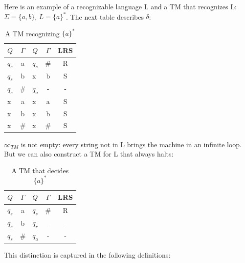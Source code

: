 Here is an example of a recognizable language L and a TM that
recognizes L: $\Sigma = \{a,b\}$, $L = \{a\}^*$. The next table
describes $\delta$:

\begin{table}[ht]
\center
\begin{tabular}{|l|c||l|c|c|}
\hline
$Q$    & $\Gamma$   &  $Q$  &  $\Gamma$ &  LRS \\ \hline
$q_s$  &  a         &  $q_s$&   \#      &  R   \\ 
$q_s$  &  b         &  x    &    b      &  S   \\ 
$q_s$  &  \#        &  $q_a$&    -      &  -   \\ 
x      &  a         &  x    &    a      &  S   \\ 
x      &  b         &  x    &    b      &  S   \\ 
x      &  \#        &  x    &    \#     &  S   \\ 
\hline
\end{tabular}
\caption{A TM recognizing $\{a\}^*$} \label{turing3}
\end{table}
$\infty_{TM}$ is not empty: every string not in L brings the machine
in an infinite loop. But we can also construct a TM for L that always
halts:

\begin{table}[ht]
\center
\begin{tabular}{|l|c||l|c|c|}
\hline
$Q$    & $\Gamma$   &  $Q$  &  $\Gamma$ &  LRS \\ \hline
$q_s$  &  a         &  $q_s$&   \#      &  R   \\ 
$q_s$  &  b         &  $q_r$&    -      &  -   \\ 
$q_s$  &  \#        &  $q_a$&    -      &  -   \\ 
\hline
\end{tabular}
\caption{A TM that decides $\{a\}^*$} \label{turing4}
\end{table}

This distinction is captured in the following definitions:





